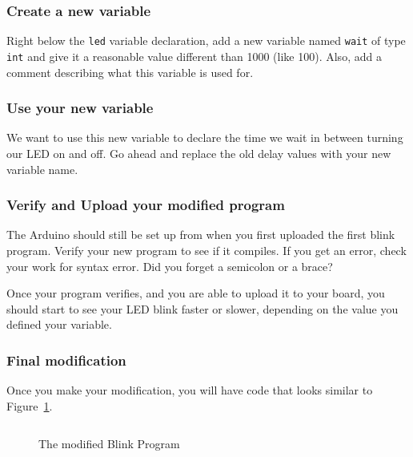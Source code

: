 \documentclass[11pt,a4paper]{article}
\begin{document}
\subsubsection{Create a new variable} %
\label{ssub:create_a_new_variable}

Right below the \texttt{led} variable declaration, add a new variable named \texttt{wait} of type \texttt{int} and give it a reasonable value different than 1000 (like 100).  Also, add a comment describing what this variable is used for.

\subsubsection{Use your new variable} %
\label{ssub:use_your_new_variable}

We want to use this new variable to declare the time we wait in between turning our LED on and off.  Go ahead and replace the old delay values with your new variable name.  


\subsubsection{Verify and Upload your modified program} %
\label{ssub:verify_and_upload_your_modified_program}

The Arduino should still be set up from when you first uploaded the first blink program.  Verify your new program to see if it compiles.  If you get an error, check your work for syntax error.  Did you forget a semicolon or a brace?

Once your program verifies, and you are able to upload it to your board, you should start to see your LED blink faster or slower, depending on the value you defined your variable.


\subsubsection{Final modification} %
\label{ssub:final_modification}

Once you make your modification, you will have code that looks similar to Figure~\ref{fig:blinkmod}.
\begin{figure}[htbp]
	\centering
\inputminted[mathescape,linenos,numbersep=5pt,gobble=0,frame=lines,framesep=2mm]{c}{code/blink_mod/blink_mod.ino}
	\caption{The modified Blink Program}
	\label{fig:blinkmod}
\end{figure}
\end{document}
